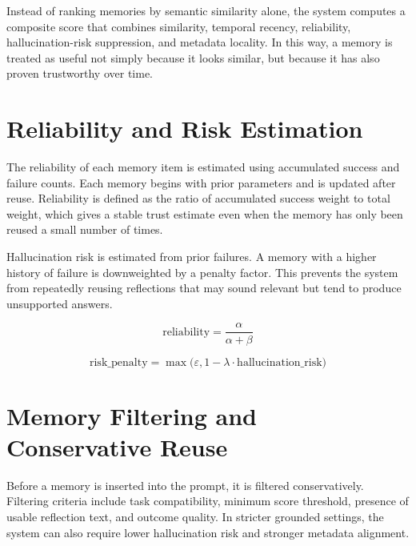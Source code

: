 Instead of ranking memories by semantic similarity alone, the system computes a composite score that combines similarity, temporal recency, reliability, hallucination-risk suppression, and metadata locality. In this way, a memory is treated as useful not simply because it looks similar, but because it has also proven trustworthy over time.


\section{Reliability and Risk Estimation}
\label{sec:reliability-and-risk-estimation}

The reliability of each memory item is estimated using accumulated success and failure counts. Each memory begins with prior parameters and is updated after reuse. Reliability is defined as the ratio of accumulated success weight to total weight, which gives a stable trust estimate even when the memory has only been reused a small number of times.

Hallucination risk is estimated from prior failures. A memory with a higher history of failure is downweighted by a penalty factor. This prevents the system from repeatedly reusing reflections that may sound relevant but tend to produce unsupported answers.


\begin{equation}
\label{eq:reliability-marker}
\mathrm{reliability} = \frac{\alpha}{\alpha + \beta}
\end{equation}

\begin{equation}
\label{eq:risk-penalty-marker}
\mathrm{risk\_penalty} = \max\bigl(\varepsilon, 1 - \lambda \cdot \mathrm{hallucination\_risk}\bigr)
\end{equation}

\section{Memory Filtering and Conservative Reuse}
\label{sec:memory-filtering}

Before a memory is inserted into the prompt, it is filtered conservatively. Filtering criteria include task compatibility, minimum score threshold, presence of usable reflection text, and outcome quality. In stricter grounded settings, the system can also require lower hallucination risk and stronger metadata alignment.

